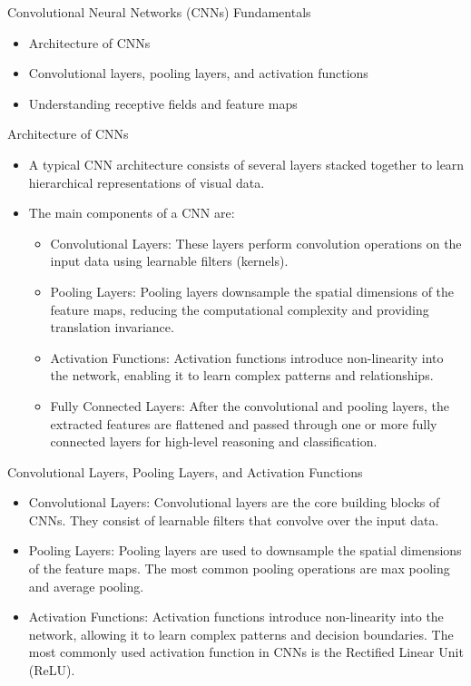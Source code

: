 \documentclass{beamer}
\begin{document}
\begin{frame}{Convolutional Neural Networks (CNNs) Fundamentals}
\begin{itemize}
    \item Architecture of CNNs
    \item Convolutional layers, pooling layers, and activation functions
    \item Understanding receptive fields and feature maps
\end{itemize}
\end{frame}

\begin{frame}{Architecture of CNNs}
\begin{itemize}
    \item A typical CNN architecture consists of several layers stacked together to learn hierarchical representations of visual data. 
    \item The main components of a CNN are:
        \begin{itemize}
            \item Convolutional Layers: These layers perform convolution operations on the input data using learnable filters (kernels).
            \item Pooling Layers: Pooling layers downsample the spatial dimensions of the feature maps, reducing the computational complexity and providing translation invariance.
            \item Activation Functions: Activation functions introduce non-linearity into the network, enabling it to learn complex patterns and relationships. 
            \item Fully Connected Layers: After the convolutional and pooling layers, the extracted features are flattened and passed through one or more fully connected layers for high-level reasoning and classification.
        \end{itemize}
\end{itemize}
\end{frame}

\begin{frame}{Convolutional Layers, Pooling Layers, and Activation Functions}
\begin{itemize}
    \item Convolutional Layers: Convolutional layers are the core building blocks of CNNs. They consist of learnable filters that convolve over the input data.
    \item Pooling Layers: Pooling layers are used to downsample the spatial dimensions of the feature maps. The most common pooling operations are max pooling and average pooling.
    \item Activation Functions: Activation functions introduce non-linearity into the network, allowing it to learn complex patterns and decision boundaries. The most commonly used activation function in CNNs is the Rectified Linear Unit (ReLU).
\end{itemize}
\end{frame}
\end{document}
